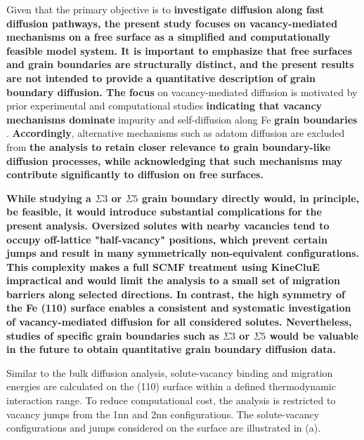 \documentclass[preprint,12pt]{elsarticle}
\providecommand{\DIFaddtex}[1]{{\bf #1}} %
\providecommand{\DIFdeltex}[1]{} %
\providecommand{\DIFaddbegin}{\protect\color{blue}} %
\providecommand{\DIFaddend}{\protect\color{black}} %
\providecommand{\DIFdelbegin}{\protect\color{red}} %
\providecommand{\DIFdelend}{\protect\color{black}} %
\providecommand{\DIFadd}[1]{\texorpdfstring{\DIFaddtex{#1}}{#1}} %
\providecommand{\DIFdel}[1]{\texorpdfstring{\DIFdeltex{#1}}{}} %
\newcommand{\DIFscaledelfig}{0.5}
\newlength{\DIFdelgraphicswidth} %
\newlength{\DIFdelgraphicsheight} %
\newcommand{\DIFaddincludegraphics}[2][]{{\color{blue}\fbox{\DIFOincludegraphics[#1]{#2}}}} %
\newcommand{\DIFdelincludegraphics}[2][]{%
\sbox{\DIFdelgraphicsbox}{\DIFOincludegraphics[#1]{#2}}%
\settoboxwidth{\DIFdelgraphicswidth}{\DIFdelgraphicsbox} %
\settoboxtotalheight{\DIFdelgraphicsheight}{\DIFdelgraphicsbox} %
\scalebox{\DIFscaledelfig}{%
\parbox[b]{\DIFdelgraphicswidth}{\usebox{\DIFdelgraphicsbox}\\[-\baselineskip] \rule{\DIFdelgraphicswidth}{0em}}\llap{\resizebox{\DIFdelgraphicswidth}{\DIFdelgraphicsheight}{%
\setlength{\unitlength}{\DIFdelgraphicswidth}%
\begin{picture}(1,1)%
\thicklines\linethickness{2pt} %
{\color[rgb]{1,0,0}\put(0,0){\framebox(1,1){}}}%
{\color[rgb]{1,0,0}\put(0,0){\line( 1,1){1}}}%
{\color[rgb]{1,0,0}\put(0,1){\line(1,-1){1}}}%
\end{picture}%
}\hspace*{3pt}}} %
} %
\DeclareRobustCommand{\DIFaddbegin}{\DIFOaddbegin \let\includegraphics\DIFaddincludegraphics} %
\DeclareRobustCommand{\DIFaddend}{\DIFOaddend \let\includegraphics\DIFOincludegraphics} %
\DeclareRobustCommand{\DIFdelbegin}{\DIFOdelbegin \let\includegraphics\DIFdelincludegraphics} %
\DeclareRobustCommand{\DIFdelend}{\DIFOaddend \let\includegraphics\DIFOincludegraphics} %
\begin{document}
Given that the primary objective is to \DIFdelbegin \DIFdel{use surface diffusivities as a surrogate for GB diffusivities, our analysis focuses exclusively }\DIFdelend \DIFaddbegin \DIFadd{investigate diffusion along fast diffusion pathways, the present study focuses on vacancy-mediated mechanisms on a free surface as a simplified and computationally feasible model system. It is important to emphasize that free surfaces and grain boundaries are structurally distinct, and the present results are not intended to provide a quantitative description of grain boundary diffusion. The focus }\DIFaddend on vacancy-mediated diffusion \DIFdelbegin \DIFdel{mechanisms. This }\DIFdelend is motivated by prior experimental and computational studies \DIFdelbegin \DIFdel{that indicate that vacancy diffusion is a dominant mechanism for }\DIFdelend \DIFaddbegin \DIFadd{indicating that vacancy mechanisms dominate }\DIFaddend impurity and self-diffusion along Fe \DIFdelbegin \DIFdel{GBs }\DIFdelend \DIFaddbegin \DIFadd{grain boundaries }\DIFaddend \cite{balluffi1982grain,peterson1983grain, klotsman1990impurity, kwok1981, inoue2007grain}. \DIFdelbegin \DIFdel{As such}\DIFdelend \DIFaddbegin \DIFadd{Accordingly}\DIFaddend , alternative mechanisms \DIFdelbegin \DIFdel{, }\DIFdelend such as adatom diffusion \DIFdelbegin \DIFdel{, }\DIFdelend are excluded from \DIFdelbegin \DIFdel{consideration in this work. }\DIFdelend \DIFaddbegin \DIFadd{the analysis to retain closer relevance to grain boundary-like diffusion processes, while acknowledging that such mechanisms may contribute significantly to diffusion on free surfaces.
}\DIFaddend 

\DIFaddbegin \DIFadd{While studying a $\Sigma3$ or $\Sigma5$ grain boundary directly would, in principle, be feasible, it would introduce substantial complications for the present analysis. Oversized solutes with nearby vacancies tend to occupy off-lattice "half-vacancy" positions, which prevent certain jumps and result in many symmetrically non-equivalent configurations. This complexity makes a full SCMF treatment using KineCluE impractical and would limit the analysis to a small set of migration barriers along selected directions. In contrast, the high symmetry of the Fe (110) surface enables a consistent and systematic investigation of vacancy-mediated diffusion for all considered solutes. Nevertheless, studies of specific grain boundaries such as $\Sigma3$ or $\Sigma5$ would be valuable in the future to obtain quantitative grain boundary diffusion data.
}

\DIFaddend Similar to the bulk diffusion analysis, solute-vacancy binding and migration energies are calculated on the (110) surface within a defined thermodynamic interaction range. To reduce computational cost, the analysis is restricted to vacancy jumps from the 1nn and 2nn configurations\DIFdelbegin \DIFdel{, omitting jumps from the 3nn to 5nn configurations that were included in the bulk Fe study}\DIFdelend . The solute-vacancy configurations and jumps considered on the surface are illustrated in (a).
\end{document}
